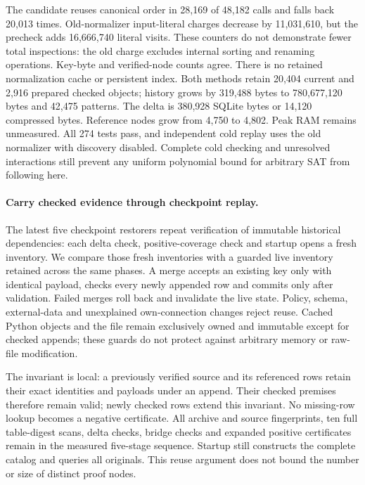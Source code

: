 \documentclass[11pt,a4paper]{article}
\numberwithin{equation}{section}
\theoremstyle{plain}
\theoremstyle{definition}
\theoremstyle{remark}
\begin{document}
The candidate reuses canonical order in 28,169 of 48,182 calls and falls back
20,013 times. Old-normalizer input-literal charges decrease by 11,031,610, but
the precheck adds 16,666,740 literal visits. These counters do not demonstrate
fewer total inspections: the old charge excludes internal sorting and renaming
operations. Key-byte and verified-node counts agree. There is no retained
normalization cache or persistent index. Both methods retain 20,404 current and
2,916 prepared checked objects; history grows by 319,488 bytes to 780,677,120
bytes and 42,475 patterns. The delta is 380,928 SQLite bytes or 14,120 compressed
bytes. Reference nodes grow from 4,750 to 4,802. Peak RAM remains unmeasured.
All 274 tests pass, and independent cold replay uses the old normalizer with
discovery disabled. Complete cold checking and unresolved interactions still
prevent any uniform polynomial bound for arbitrary SAT from following here.

\paragraph{Carry checked evidence through checkpoint replay.}
The latest five checkpoint restorers repeat verification of immutable
historical dependencies: each delta check, positive-coverage check and startup
opens a fresh inventory. We compare those fresh inventories with a guarded
live inventory retained across the same phases. A merge accepts an existing
key only with identical payload, checks every newly appended row and commits
only after validation. Failed merges roll back and invalidate the live state.
Policy, schema, external-data and unexplained own-connection changes reject
reuse. Cached Python objects and the file remain exclusively owned and immutable
except for checked appends; these guards do not protect against arbitrary memory
or raw-file modification.

The invariant is local: a previously verified source and its referenced rows
retain their exact identities and payloads under an append. Their checked
premises therefore remain valid; newly checked rows extend this invariant.
No missing-row lookup becomes a negative certificate. All archive and source
fingerprints, ten full table-digest scans, delta checks, bridge checks and
expanded positive certificates remain in the measured five-stage sequence.
Startup still constructs the complete catalog and queries all originals.
This reuse argument does not bound the number or size of distinct proof nodes.
\end{document}
